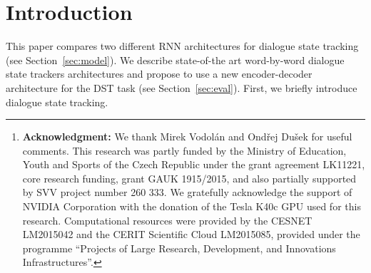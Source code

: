 \documentclass{itatnew}
\begin{document}
\begin{abstract}
This paper discusses models for dialogue state tracking using recurrent neural networks (RNN).
We present experiments on the standard dialogue state tracking (DST) dataset, DSTC2~\cite{henderson2014second}.
On the one hand, RNN models became state of the art in DST,
on the other hand, most state-of-the-art models are only turn-based and require dataset-specific preprocessing (e.g. DSTC2-specific) in order to achieve state-of-the-art results.
We implemented two architectures which can be used in incremental settings and require almost no preprocessing.
We compare their performance to the benchmarks on DSTC2 and discuss their properties.
With only trivial preprocessing, the performance of our models is close to the state-of-the-art results.\footnote{
    {\bf Acknowledgment:} We thank Mirek Vodolán and Ondřej Dušek for useful comments.
    This research was partly funded by the Ministry of Education, Youth and Sports of the Czech Republic under the grant agreement LK11221, core research funding, grant GAUK 1915/2015, and also partially supported by SVV project number 260 333. 
    We gratefully acknowledge the support of NVIDIA Corporation with the donation of the Tesla K40c GPU used for this research.
    Computational resources were provided by the CESNET LM2015042 and the CERIT Scientific Cloud LM2015085, provided under the programme ``Projects of Large Research, Development, and Innovations Infrastructures''.
    }
\end{abstract}

\section{Introduction}
 
This paper compares two different RNN architectures for dialogue state tracking (see Section~\ref{sec:model}).
We describe state-of-the art word-by-word dialogue state trackers architectures and propose to use a new encoder-decoder architecture for the DST task (see Section~\ref{sec:eval}).
First, we briefly introduce dialogue state tracking.
\end{document}
